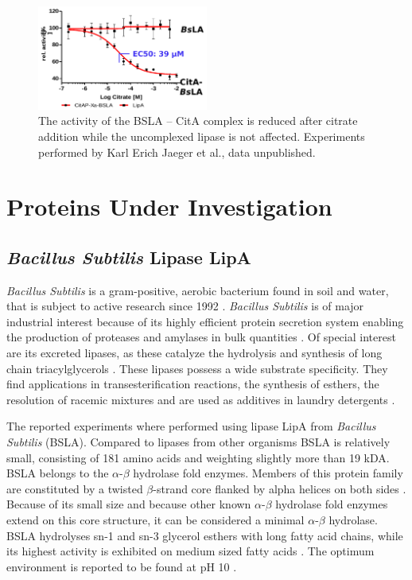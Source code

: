 \documentclass[english, a4paper, 12pt, titlepage, draft]{article}
\begin{document}
\begin{figure}
    \centering
    \includegraphics[width=0.5\textwidth]{figures/BSLA_activity/BSLA_activity.png}
    \caption{The activity of the BSLA -- CitA complex is reduced after citrate addition while the uncomplexed lipase is not affected. Experiments performed by Karl Erich Jaeger et al., data unpublished.}
    \label{fig:BSLAactivity}
\end{figure}



\section{Proteins Under Investigation}


\subsection{\textit{Bacillus Subtilis} Lipase LipA}

\textit{Bacillus Subtilis} is a gram-positive, aerobic bacterium found in soil and water, that is subject to active research since 1992 \cite{bacillusSubtilis}.
\textit{Bacillus Subtilis} is of major industrial interest because of its highly efficient protein secretion system \cite{BSsecretion} enabling the production of proteases and amylases in bulk quantities \cite{BSworkhorse}.
Of special interest are its excreted lipases, as these catalyze the hydrolysis and synthesis of long chain triacylglycerols \cite{BSLA_1I6W}.
These lipases possess a wide substrate specificity.
They find applications in transesterification reactions, the synthesis of esthers, the resolution of racemic mixtures and are used as additives in laundry detergents \cite{BSdetergents}.

The reported experiments where performed using lipase LipA from \textit{Bacillus Subtilis} (BSLA).
Compared to lipases from other organisms BSLA is relatively small, consisting of 181 amino acids and weighting slightly more than 19 kDA.
BSLA belongs to the $\alpha$-$\beta$ hydrolase fold enzymes.
Members of this protein family are constituted by a twisted $\beta$-strand core flanked by alpha helices on both sides \cite{alphaBetaHydrolases}.
Because of its small size and because other known $\alpha$-$\beta$ hydrolase fold enzymes extend on this core structure, it can be considered a minimal $\alpha$-$\beta$ hydrolase.
BSLA hydrolyses sn-1 and sn-3 glycerol esthers with long fatty acid chains, while its highest activity is exhibited on medium sized fatty acids \cite{BSLA_1I6W}.
The optimum environment is reported to be found at pH 10 \cite{BSLA_1I6W}.
\end{document}
